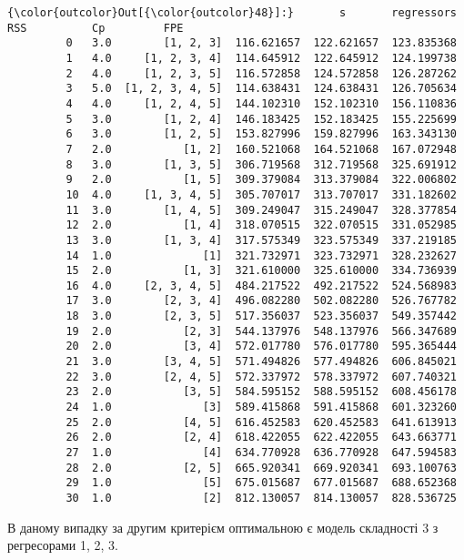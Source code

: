 \documentclass[11pt]{article}
\begin{document}
\begin{Verbatim}[commandchars=\\\{\}]
{\color{outcolor}Out[{\color{outcolor}48}]:}       s       regressors         RSS          Cp         FPE
         0   3.0        [1, 2, 3]  116.621657  122.621657  123.835368
         1   4.0     [1, 2, 3, 4]  114.645912  122.645912  124.199738
         2   4.0     [1, 2, 3, 5]  116.572858  124.572858  126.287262
         3   5.0  [1, 2, 3, 4, 5]  114.638431  124.638431  126.705634
         4   4.0     [1, 2, 4, 5]  144.102310  152.102310  156.110836
         5   3.0        [1, 2, 4]  146.183425  152.183425  155.225699
         6   3.0        [1, 2, 5]  153.827996  159.827996  163.343130
         7   2.0           [1, 2]  160.521068  164.521068  167.072948
         8   3.0        [1, 3, 5]  306.719568  312.719568  325.691912
         9   2.0           [1, 5]  309.379084  313.379084  322.006802
         10  4.0     [1, 3, 4, 5]  305.707017  313.707017  331.182602
         11  3.0        [1, 4, 5]  309.249047  315.249047  328.377854
         12  2.0           [1, 4]  318.070515  322.070515  331.052985
         13  3.0        [1, 3, 4]  317.575349  323.575349  337.219185
         14  1.0              [1]  321.732971  323.732971  328.232627
         15  2.0           [1, 3]  321.610000  325.610000  334.736939
         16  4.0     [2, 3, 4, 5]  484.217522  492.217522  524.568983
         17  3.0        [2, 3, 4]  496.082280  502.082280  526.767782
         18  3.0        [2, 3, 5]  517.356037  523.356037  549.357442
         19  2.0           [2, 3]  544.137976  548.137976  566.347689
         20  2.0           [3, 4]  572.017780  576.017780  595.365444
         21  3.0        [3, 4, 5]  571.494826  577.494826  606.845021
         22  3.0        [2, 4, 5]  572.337972  578.337972  607.740321
         23  2.0           [3, 5]  584.595152  588.595152  608.456178
         24  1.0              [3]  589.415868  591.415868  601.323260
         25  2.0           [4, 5]  616.452583  620.452583  641.613913
         26  2.0           [2, 4]  618.422055  622.422055  643.663771
         27  1.0              [4]  634.770928  636.770928  647.594583
         28  2.0           [2, 5]  665.920341  669.920341  693.100763
         29  1.0              [5]  675.015687  677.015687  688.652368
         30  1.0              [2]  812.130057  814.130057  828.536725
\end{Verbatim}
    
    В даному випадку за другим критерієм оптимальною є модель складності 3 з регресорами 1, 2, 3. 
\end{document}
